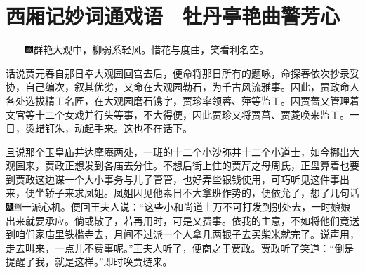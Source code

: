 

\chapter{西厢记妙词通戏语　牡丹亭艳曲警芳心}\label{part0027_split_000.htmlux5cux23calibre_pb_0}

{　　\includegraphics[width=3mm]{../Images/00005}群艳大观中，柳弱系轻风。惜花与度曲，笑看利名空。}

话说贾元春自那日幸大观园回宫去后，便命将那日所有的题咏，命探春依次抄录妥协，自己编次，叙其优劣，又命在大观园勒石，为千古风流雅事。因此，贾政命人各处选拔精工名匠，在大观园磨石镌字，贾珍率领蓉、萍等监工。因贾蔷又管理着文官等十二个女戏并行头等事，不大得便，因此贾珍又将贾菖、贾菱唤来监工。一日，烫蜡钉朱，动起手来。这也不在话下。

且说那个玉皇庙并达摩庵两处，一班的十二个小沙弥并十二个小道士，如今挪出大观园来，贾政正想发到各庙去分住。不想后街上住的贾芹之母周氏，正盘算着也要到贾政这边谋一个大小事务与儿子管管，也好弄些银钱使用，可巧听见这件事出来，便坐轿子来求凤姐。凤姐因见他素日不大拿班作势的，便依允了，想了几句话{\includegraphics[width=3mm]{../Images/00004}\includegraphics[width=3mm]{../Images/00011}\footnotesize \kaishu 一派心机。}便回王夫人说：``这些小和尚道士万不可打发到别处去，一时娘娘出来就要承应。倘或散了，若再用时，可是又费事。依我的主意，不如将他们竟送到咱们家庙里铁槛寺去，月间不过派一个人拿几两银子去买柴米就完了。说声用，走去叫来，一点儿不费事呢。''王夫人听了，便商之于贾政。贾政听了笑道：``倒是提醒了我，就是这样。''即时唤贾琏来。

